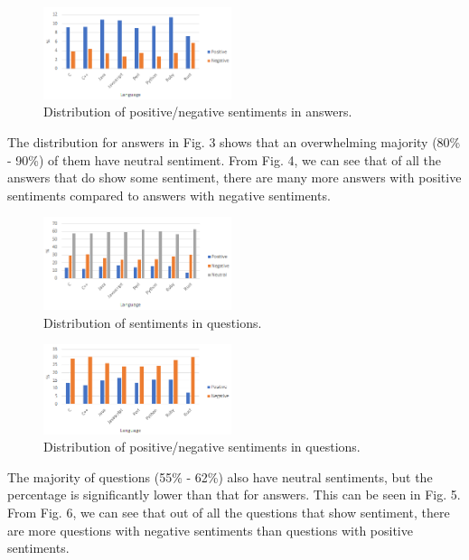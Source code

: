 \documentclass[conference]{IEEEtran}
\begin{document}
\begin{figure}[htbp]
\centerline{\includegraphics[width=0.49\textwidth]{figures/summA.png}}
\caption{Distribution of positive/negative sentiments in answers.}
\label{fig}
\end{figure}

The distribution for answers in Fig. 3 shows that an overwhelming majority (80\% - 90\%) of them have neutral sentiment. From Fig. 4, we can see that of all the answers that do show some sentiment, there are many more answers with positive sentiments compared to answers with negative sentiments.\\

\begin{figure}[htbp]
\centerline{\includegraphics[width=0.49\textwidth]{figures/summNeutralQ.png}}
\caption{Distribution of sentiments in questions.}
\label{fig}
\end{figure}

\begin{figure}[htbp]
\centerline{\includegraphics[width=0.49\textwidth]{figures/summQ.png}}
\caption{Distribution of positive/negative sentiments in questions.}
\label{fig}
\end{figure}

The majority of questions (55\% - 62\%) also have neutral sentiments, but the percentage is significantly lower than that for answers. This can be seen in Fig. 5. From Fig. 6, we can see that out of all the questions that show sentiment, there are more questions with negative sentiments than questions with positive sentiments. \\
\end{document}
